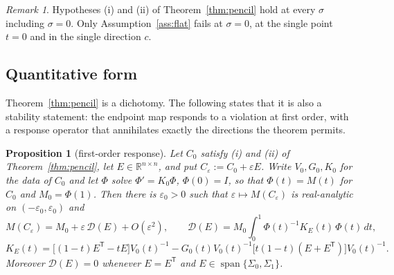 \documentclass[11pt]{article}
\newtheorem{proposition}[lemma]{Proposition}
\theoremstyle{definition}
\theoremstyle{remark}
\newtheorem{remark}[lemma]{Remark}
\DeclareMathOperator{\spn}{span}
\newcommand{\R}{\mathbb{R}}
\newcommand{\T}{\mathsf{T}}
\begin{document}
\begin{remark}\label{rem:sigread}
Hypotheses (i) and (ii) of Theorem~\ref{thm:pencil} hold at every $\sigma$ including $\sigma=0$.
Only Assumption~\ref{ass:flat} fails at $\sigma=0$, at the single point $t=0$ and in the single
direction $c$.
\end{remark}

\subsection{Quantitative form}

Theorem~\ref{thm:pencil} is a dichotomy. The following states that it is also a stability
statement: the endpoint map responds to a violation at first order, with a response operator that
annihilates exactly the directions the theorem permits.

\begin{proposition}[first-order response]\label{prop:stab}
Let $C_0$ satisfy \textup{(i)} and \textup{(ii)} of Theorem~\ref{thm:pencil}, let
$E\in\R^{n\times n}$, and put $C_\varepsilon:=C_0+\varepsilon E$. Write $V_0,G_0,K_0$ for the data
of $C_0$ and let $\Phi$ solve $\Phi'=K_0\Phi$, $\Phi(0)=I$, so that $\Phi(t)=M(t)$ for $C_0$ and
$M_0=\Phi(1)$. Then there is $\varepsilon_0>0$ such that
$\varepsilon\mapsto M(C_\varepsilon)$ is real-analytic on $(-\varepsilon_0,\varepsilon_0)$ and
\begin{equation}\label{eq:resp}
M(C_\varepsilon)=M_0+\varepsilon\,\mathcal D(E)+O(\varepsilon^{2}),
\qquad
\mathcal D(E)=M_0\int_0^1\Phi(t)^{-1}K_E(t)\,\Phi(t)\,dt,
\end{equation}
\begin{equation}\label{eq:KE}
K_E(t)=\big[(1-t)E^{\T}-tE\big]V_0(t)^{-1}
-G_0(t)V_0(t)^{-1}\big[t(1-t)(E+E^{\T})\big]V_0(t)^{-1}.
\end{equation}
Moreover $\mathcal D(E)=0$ whenever $E=E^{\T}$ and $E\in\spn\{\Sigma_0,\Sigma_1\}$.
\end{proposition}
\end{document}

